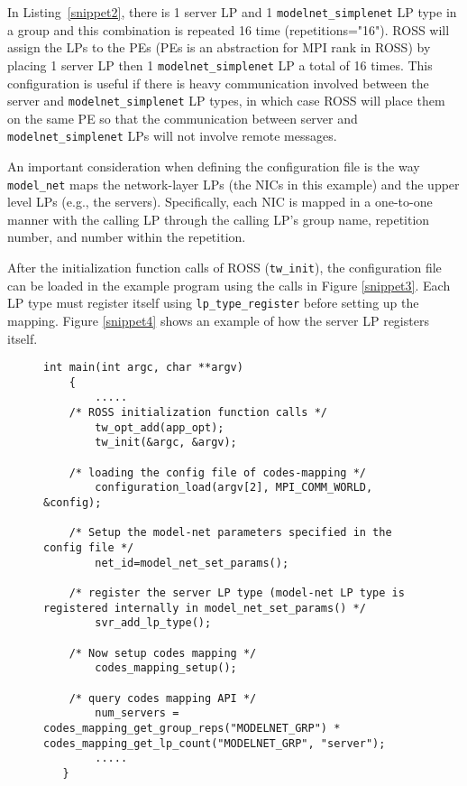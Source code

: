 \documentclass[conference,10pt,compsocconf,onecolumn]{IEEEtran}
\newcommand{\codesmodelnet}[1]{\texttt{model\_net}}
\begin{document}
In Listing~\ref{snippet2}, there is 1 server LP and 1
\texttt{modelnet\_simplenet} LP type in a group and this combination is repeated
16 time (repetitions="16").  ROSS will assign the LPs to the PEs (PEs is an
abstraction for MPI rank in ROSS) by placing 1 server LP then 1
\texttt{modelnet\_simplenet} LP a total of 16 times. This configuration is
useful if there is heavy communication involved between the server and
\texttt{modelnet\_simplenet} LP types, in which case ROSS will place them on the
same PE so that the communication between server and
\texttt{modelnet\_simplenet} LPs will not involve remote messages. 

An important consideration when defining the configuration file is the way
\codesmodelnet{} maps the network-layer LPs (the NICs in this example) and the upper
level LPs (e.g., the servers). Specifically, each NIC is mapped in a one-to-one
manner with the calling LP through the calling LP's group name, repetition
number, and number within the repetition.

After the initialization function calls of ROSS (\texttt{tw\_init}), the configuration
file can be loaded in the example program using the calls in Figure
\ref{snippet3}. Each LP type must register itself using \texttt{lp\_type\_register}
before setting up the mapping. Figure \ref{snippet4} shows an example of how
the server LP registers itself. 

\begin{figure}
\begin{lstlisting}[caption=CODES mapping function calls in example program, label=snippet3]
    int main(int argc, char **argv)
    {
    	.....
	/* ROSS initialization function calls */
    	tw_opt_add(app_opt);
    	tw_init(&argc, &argv);

	/* loading the config file of codes-mapping */
    	configuration_load(argv[2], MPI_COMM_WORLD, &config);

	/* Setup the model-net parameters specified in the config file */
    	net_id=model_net_set_params();
	
	/* register the server LP type (model-net LP type is registered internally in model_net_set_params() */
    	svr_add_lp_type();

	/* Now setup codes mapping */
    	codes_mapping_setup();

	/* query codes mapping API */
    	num_servers = codes_mapping_get_group_reps("MODELNET_GRP") * codes_mapping_get_lp_count("MODELNET_GRP", "server");
    	..... 
   }
\end{lstlisting}
\end{figure}
\end{document}
